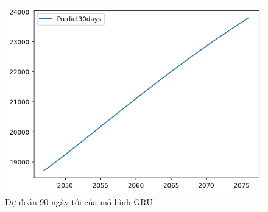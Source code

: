 \begin{figure}[H]
\begin{minipage}{0.15\textwidth}
    \includegraphics[width=1\textwidth]{resources/chapter-5/predicted/EXIM-GRU_9-1_30days.png}
    \end{minipage}
    \hfill
    
    \caption{Dự đoán 90 ngày tới của mô hình GRU}
    \label{fig:GRU_30days}
\end{figure}





